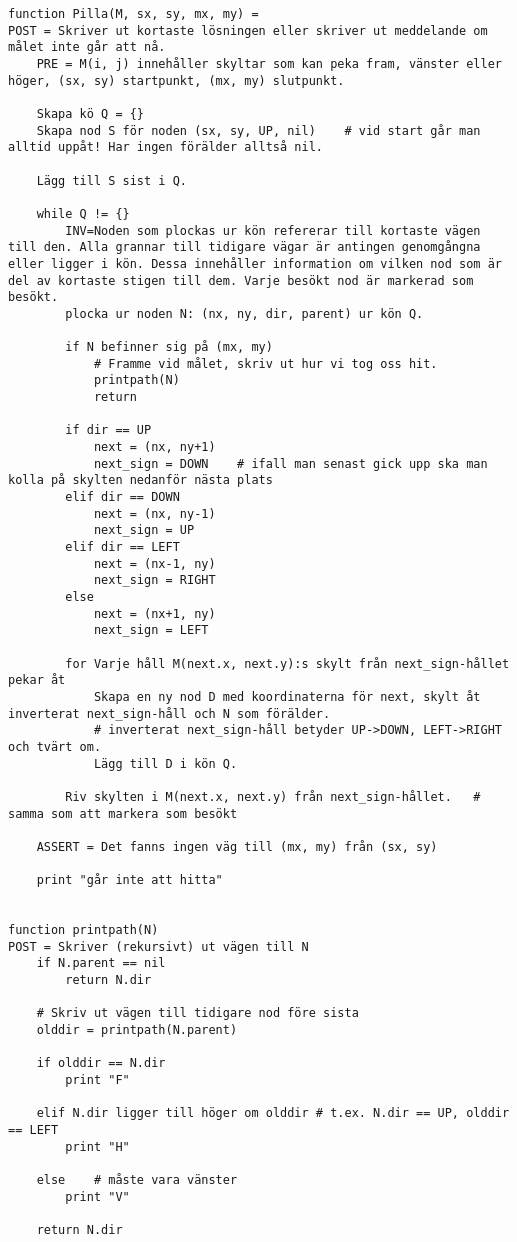 \documentclass[a4paper,10pt,twoside]{article}
\begin{document}
\begin{lstlisting}
function Pilla(M, sx, sy, mx, my) =
POST = Skriver ut kortaste lösningen eller skriver ut meddelande om målet inte går att nå.
	PRE = M(i, j) innehåller skyltar som kan peka fram, vänster eller höger, (sx, sy) startpunkt, (mx, my) slutpunkt.

	Skapa kö Q = {}
	Skapa nod S för noden (sx, sy, UP, nil)    # vid start går man alltid uppåt! Har ingen förälder alltså nil.

	Lägg till S sist i Q.

	while Q != {}
		INV=Noden som plockas ur kön refererar till kortaste vägen till den. Alla grannar till tidigare vägar är antingen genomgångna eller ligger i kön. Dessa innehåller information om vilken nod som är del av kortaste stigen till dem. Varje besökt nod är markerad som besökt.
		plocka ur noden N: (nx, ny, dir, parent) ur kön Q.

		if N befinner sig på (mx, my)
			# Framme vid målet, skriv ut hur vi tog oss hit.
			printpath(N)
			return

		if dir == UP
			next = (nx, ny+1)
			next_sign = DOWN    # ifall man senast gick upp ska man kolla på skylten nedanför nästa plats
		elif dir == DOWN
			next = (nx, ny-1)
			next_sign = UP
		elif dir == LEFT
			next = (nx-1, ny)
			next_sign = RIGHT
		else
			next = (nx+1, ny)
			next_sign = LEFT

		for Varje håll M(next.x, next.y):s skylt från next_sign-hållet pekar åt
			Skapa en ny nod D med koordinaterna för next, skylt åt inverterat next_sign-håll och N som förälder.
			# inverterat next_sign-håll betyder UP->DOWN, LEFT->RIGHT och tvärt om.
			Lägg till D i kön Q.

		Riv skylten i M(next.x, next.y) från next_sign-hållet.   # samma som att markera som besökt

	ASSERT = Det fanns ingen väg till (mx, my) från (sx, sy)

	print "går inte att hitta"


function printpath(N)
POST = Skriver (rekursivt) ut vägen till N
	if N.parent == nil
		return N.dir

	# Skriv ut vägen till tidigare nod före sista
	olddir = printpath(N.parent)

	if olddir == N.dir
		print "F"

	elif N.dir ligger till höger om olddir # t.ex. N.dir == UP, olddir == LEFT
		print "H"

	else    # måste vara vänster
		print "V"

	return N.dir

\end{lstlisting}
\end{document}
